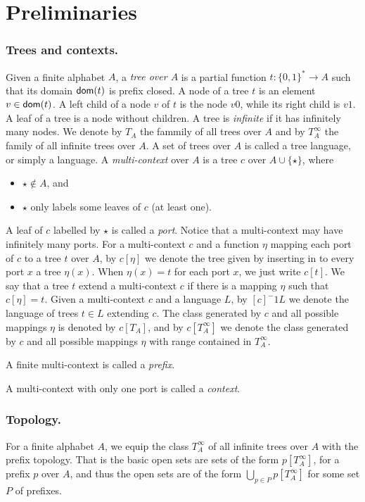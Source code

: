 
\section{Preliminaries}
\subsubsection*{Trees and contexts.}
Given a finite alphabet $A$, a \emph{tree over $A$} is a partial function $t: \{0,1\}^* \to A$ such that its domain $\mathsf{dom}(t)$ is prefix closed. A node of a tree $t$ is an element $v \in \mathsf{dom}(t)$. A left child of a node $v$ of $t$ is the node $v0$, while its right child is $v1$. A leaf of a tree is a node without children. A tree is \emph{infinite} if it has infinitely many nodes. We denote by $T_A$ the fammily of all  trees over $A$ and by $T^\infty_A$ the family of all infinite trees over $A$. A set of trees over $A$ is called a tree language, or simply a language.
A \emph{multi-context} over $A$ is a tree $c$ over $A \cup \{\star\}$, where 
\begin{itemize} 
\item $\star \notin A$, and 
\item $\star$ only labels some leaves of $c$ (at least one). 
\end{itemize}
A leaf of $c$ labelled by $\star$ is called a \emph{port}. Notice that a multi-context may have infinitely many ports. For a multi-context $c$ and a function $\eta$ mapping each port of $c$ to a tree $t$ over $A$, by $c[\eta]$ we denote the tree given by inserting in to every port $x$ a tree $\eta(x)$. When $\eta(x)=t$ for each port $x$, we just write $c[t]$.  We say that a tree $t$ extend a multi-context $c$ if there is a mapping $\eta$ such that $c[\eta]=t$. Given a multi-context $c$ and a language $L$, by $[c]^-1L$ we denote the language of trees $t\in L$ extending $c$.
 The class generated by $c$ and all possible mappings $\eta$ is denoted by $c[T_A]$, and by $c[T^\infty_A]$ we denote the class generated by $c$ and all possible mappings $\eta$ with range contained in $T_A^\infty$. 

A finite multi-context is called a \emph{prefix}.

A multi-context with only one port is called a \emph{context}. %




\subsubsection*{Topology.}
For a finite alphabet $A$, we equip the class $T^\infty_A$ of all infinite trees over $A$ with the prefix topology. That is the basic open sets are sets of the form $p[T^\infty_A]$, for a prefix $p$ over $A$, and thus the open sets are of the form $\bigcup_{p \in P}p[T^\infty_A]$ for some set $P$ of prefixes. 


